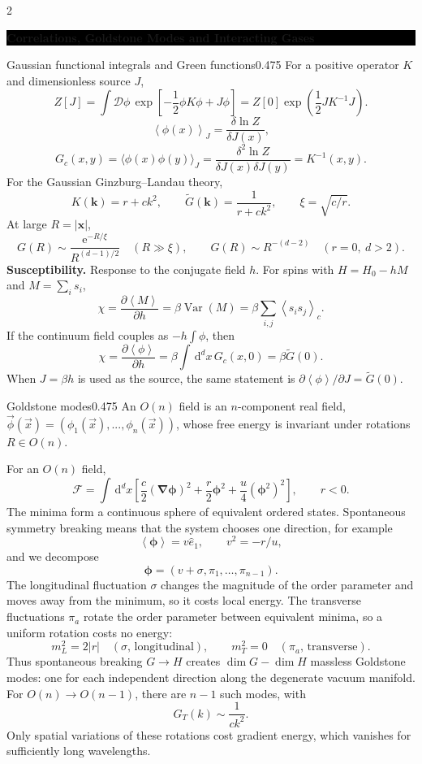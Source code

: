 \documentclass[8pt,a4paper]{extarticle}
\newcommand{\sectionbanner}[1]{%
  \par
  \Needspace{8\baselineskip}%
  \vspace{0.4ex}%
  \noindent
  \colorbox{black}{%
    \parbox{\dimexpr\linewidth-2\fboxsep\relax}{%
      \centering\color{white}\bfseries\footnotesize #1%
    }%
  }%
  \par\vspace{0.3ex}%
  \nopagebreak
}
\newcommand{\dd}{\,\mathrm d}
\newcommand{\avg}[1]{\left\langle #1\right\rangle}
\newcommand{\Var}{\operatorname{Var}}
\newcommand{\e}{\mathrm e}
\newcommand{\grad}{\boldsymbol\nabla}
\begin{document}
\begin{multicols*}{2}
\sectionbanner{Correlations, Goldstone Modes and Interacting Gases}
\begin{mytikzbox}{Gaussian functional integrals and Green functions}{0.475}
For a positive operator $K$ and dimensionless source $J$,
\[
Z[J]=\int\mathcal D\phi\,
\exp\!\left[-\frac12\phi K\phi+J\phi\right]
=Z[0]\exp\!\left(\frac12J K^{-1}J\right).
\]
\[
\avg{\phi(x)}_J=\frac{\delta\ln Z}{\delta J(x)},
\]
\[
G_c(x,y)=\langle \phi(x) \phi(y) \rangle_J = \frac{\delta^2\ln Z}{\delta J(x)\delta J(y)}=K^{-1}(x,y).
\]
For the Gaussian Ginzburg--Landau theory,
\[
K(\bm k)=r+ck^2,
\qquad \widetilde G(\bm k)=\frac1{r+ck^2},
\qquad \xi=\sqrt{c/r}.
\]
At large $R=|\bm x|$,
\[
G(R)\sim\frac{\e^{-R/\xi}}{R^{(d-1)/2}}
\quad (R\gg\xi),
\qquad
G(R)\sim R^{-(d-2)}\quad(r=0,\ d>2).
\]
\textbf{Susceptibility.} Response to the conjugate field $h$.
For spins with $H=H_0-hM$ and $M=\sum_i s_i$,
\[
\chi=\frac{\partial\avg M}{\partial h}
=\beta\Var(M)
=\beta\sum_{i,j}\avg{s_is_j}_c.
\]
If the continuum field couples as $-h\int\phi$, then
\[
\chi=\frac{\partial\avg\phi}{\partial h}
=\beta\int\dd^dx\,G_c(x,0)=\beta\widetilde G(0).
\]
When $J=\beta h$ is used as the source, the same statement is
$\partial\avg\phi/\partial J=\widetilde G(0)$.
\end{mytikzbox}

\begin{mytikzbox}{Goldstone modes}{0.475} An $O(n)$ field is an $n$-component real field, $\vec{\phi}(\vec{x}) = (\phi_1(\vec{x}),...,\phi_n(\vec{x}))$, whose free energy is invariant under rotations $R\in O(n)$. 
  
For an \(O(n)\) field, \[ \mathcal F=\int\dd^dx\left[ \frac c2(\grad\bm\phi)^2+\frac r2\bm\phi^2+ \frac u4(\bm\phi^2)^2\right],\qquad r<0. \] The minima form a continuous sphere of equivalent ordered states. Spontaneous symmetry breaking means that the system chooses one direction, for example \[ \avg{\bm\phi}=v\hat e_1,\qquad v^2=-r/u, \] and we decompose \[ \bm\phi=(v+\sigma,\pi_1,\ldots,\pi_{n-1}). \] The longitudinal fluctuation \(\sigma\) changes the magnitude of the order parameter and moves away from the minimum, so it costs local energy. The transverse fluctuations \(\pi_a\) rotate the order parameter between equivalent minima, so a uniform rotation costs no energy: \[ m_L^2=2|r|\quad(\sigma\text{, longitudinal}), \qquad m_T^2=0\quad(\pi_a\text{, transverse}). \] Thus spontaneous breaking \(G\to H\) creates \(\dim G-\dim H\) massless Goldstone modes: one for each independent direction along the degenerate vacuum manifold. For \(O(n)\to O(n-1)\), there are \(n-1\) such modes, with \[ G_T(k)\sim\frac1{ck^2}. \] Only spatial variations of these rotations cost gradient energy, which vanishes for sufficiently long wavelengths. 


\end{mytikzbox}
\end{multicols*}
\end{document}

